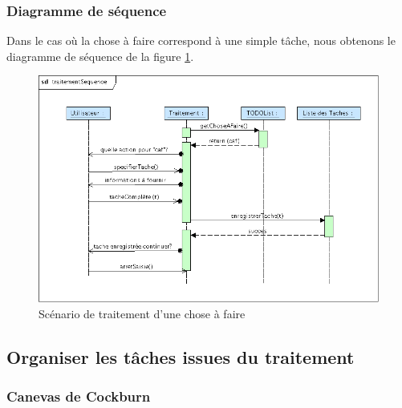 \subsubsection{Diagramme de séquence}
Dans le cas où la chose à faire correspond à une simple tâche, nous obtenons le diagramme de séquence de la figure \ref{traitementSequence}.
\begin{figure}[!ht]
\begin{center}
\includegraphics[width=12cm]{images/traitementSequence.png}
\caption{Scénario de traitement d'une chose à faire}
\label{traitementSequence}
\end{center}
\end{figure}


\subsection{Organiser les tâches issues du traitement}

\subsubsection{Canevas de Cockburn}

